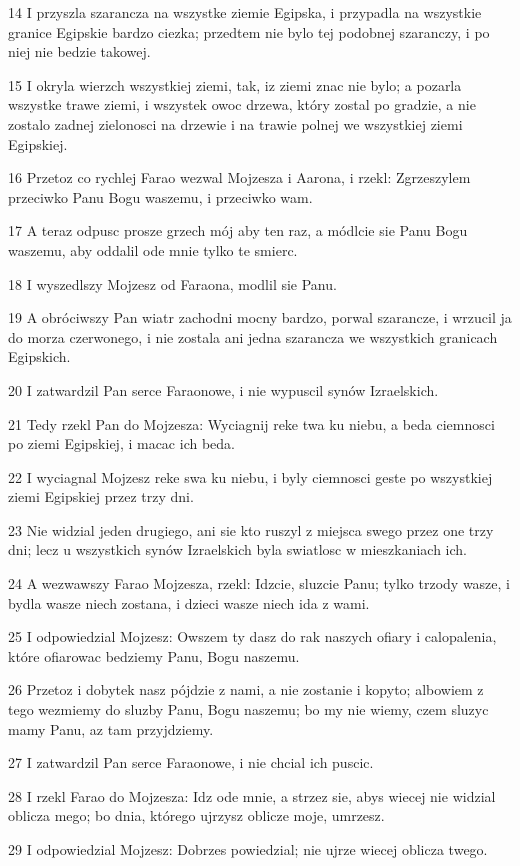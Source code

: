\par 14 I przyszla szarancza na wszystke ziemie Egipska, i przypadla na wszystkie granice Egipskie bardzo ciezka; przedtem nie bylo tej podobnej szaranczy, i po niej nie bedzie takowej.
\par 15 I okryla wierzch wszystkiej ziemi, tak, iz ziemi znac nie bylo; a pozarla wszystke trawe ziemi, i wszystek owoc drzewa, który zostal po gradzie, a nie zostalo zadnej zielonosci na drzewie i na trawie polnej we wszystkiej ziemi Egipskiej.
\par 16 Przetoz co rychlej Farao wezwal Mojzesza i Aarona, i rzekl: Zgrzeszylem przeciwko Panu Bogu waszemu, i przeciwko wam.
\par 17 A teraz odpusc prosze grzech mój aby ten raz, a módlcie sie Panu Bogu waszemu, aby oddalil ode mnie tylko te smierc.
\par 18 I wyszedlszy Mojzesz od Faraona, modlil sie Panu.
\par 19 A obróciwszy Pan wiatr zachodni mocny bardzo, porwal szarancze, i wrzucil ja do morza czerwonego, i nie zostala ani jedna szarancza we wszystkich granicach Egipskich.
\par 20 I zatwardzil Pan serce Faraonowe, i nie wypuscil synów Izraelskich.
\par 21 Tedy rzekl Pan do Mojzesza: Wyciagnij reke twa ku niebu, a beda ciemnosci po ziemi Egipskiej, i macac ich beda.
\par 22 I wyciagnal Mojzesz reke swa ku niebu, i byly ciemnosci geste po wszystkiej ziemi Egipskiej przez trzy dni.
\par 23 Nie widzial jeden drugiego, ani sie kto ruszyl z miejsca swego przez one trzy dni; lecz u wszystkich synów Izraelskich byla swiatlosc w mieszkaniach ich.
\par 24 A wezwawszy Farao Mojzesza, rzekl: Idzcie, sluzcie Panu; tylko trzody wasze, i bydla wasze niech zostana, i dzieci wasze niech ida z wami.
\par 25 I odpowiedzial Mojzesz: Owszem ty dasz do rak naszych ofiary i calopalenia, które ofiarowac bedziemy Panu, Bogu naszemu.
\par 26 Przetoz i dobytek nasz pójdzie z nami, a nie zostanie i kopyto; albowiem z tego wezmiemy do sluzby Panu, Bogu naszemu; bo my nie wiemy, czem sluzyc mamy Panu, az tam przyjdziemy.
\par 27 I zatwardzil Pan serce Faraonowe, i nie chcial ich puscic.
\par 28 I rzekl Farao do Mojzesza: Idz ode mnie, a strzez sie, abys wiecej nie widzial oblicza mego; bo dnia, którego ujrzysz oblicze moje, umrzesz.
\par 29 I odpowiedzial Mojzesz: Dobrzes powiedzial; nie ujrze wiecej oblicza twego.

